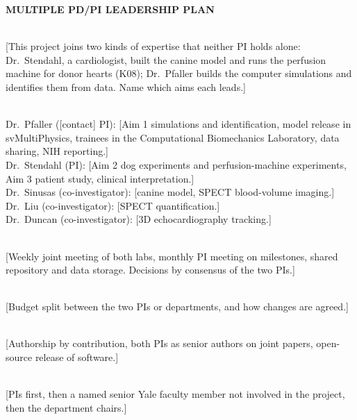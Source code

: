 \documentclass[11pt]{article}
\begin{document}
\textbf{MULTIPLE PD/PI LEADERSHIP PLAN}

\\
{}[This project joins two kinds of expertise that neither PI holds alone: Dr.~Stendahl, a cardiologist, built the canine model and runs the perfusion machine for donor hearts (K08); Dr.~Pfaller builds the computer simulations and identifies them from data. Name which aims each leads.]

\\
Dr.~Pfaller ([contact] PI): [Aim 1 simulations and identification, model release in svMultiPhysics, trainees in the Computational Biomechanics Laboratory, data sharing, NIH reporting.]\\
Dr.~Stendahl (PI): [Aim 2 dog experiments and perfusion-machine experiments, Aim 3 patient study, clinical interpretation.]\\
Dr.~Sinusas (co-investigator): [canine model, SPECT blood-volume imaging.]\\
Dr.~Liu (co-investigator): [SPECT quantification.]\\
Dr.~Duncan (co-investigator): [3D echocardiography tracking.]

\\
{}[Weekly joint meeting of both labs, monthly PI meeting on milestones, shared repository and data storage. Decisions by consensus of the two PIs.]

\\
{}[Budget split between the two PIs or departments, and how changes are agreed.]

\\
{}[Authorship by contribution, both PIs as senior authors on joint papers, open-source release of software.]

\\
{}[PIs first, then a named senior Yale faculty member not involved in the project, then the department chairs.]
\end{document}
